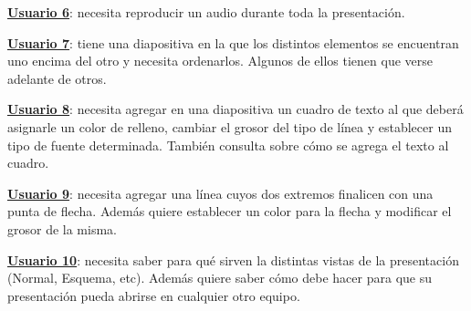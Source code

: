 \documentclass[12pt]{article}
\begin{document}
\textbf{\underline{Usuario 6}}: necesita reproducir un audio durante toda la presentación. 

\textbf{\underline{Usuario 7}}: tiene una diapositiva en la que los distintos elementos se encuentran uno encima del otro y necesita ordenarlos. Algunos de ellos tienen que verse adelante de otros. 

\textbf{\underline{Usuario 8}}: necesita agregar en una diapositiva un cuadro de texto al que deberá asignarle un color de relleno, cambiar el grosor del tipo de línea y establecer un tipo de fuente determinada. También consulta sobre cómo se agrega el texto al cuadro.

\textbf{\underline{Usuario 9}}: necesita agregar una línea cuyos dos extremos finalicen con una punta de flecha. Además quiere establecer un color para la flecha y modificar el grosor de la misma.

\textbf{\underline{Usuario 10}}: necesita saber para qué sirven la distintas vistas de la presentación (Normal, Esquema, etc). Además quiere saber cómo debe hacer para que su presentación pueda abrirse en cualquier otro equipo.
 
\end{document}
